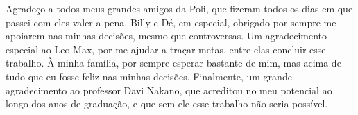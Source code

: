 \begin{agradecimentos}

Agradeço a todos meus grandes amigos da Poli, que fizeram todos os dias em que passei com eles valer a pena. Billy e Dé, em especial, obrigado por sempre me apoiarem nas minhas decisões, mesmo que controversas. Um agradecimento especial ao Leo Max, por me ajudar a traçar metas, entre elas concluir esse trabalho. À minha família, por sempre esperar bastante de mim, mas acima de tudo que eu fosse feliz nas minhas decisões. Finalmente, um grande agradecimento ao professor Davi Nakano, que acreditou no meu potencial ao longo dos anos de graduação, e que sem ele esse trabalho não seria possível.

\end{agradecimentos}